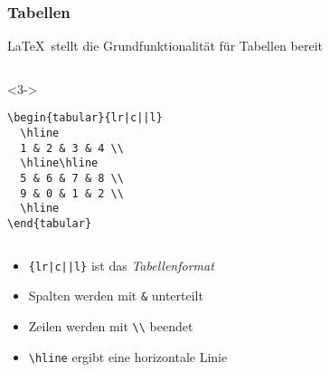 \begin{frame}[fragile]
  \frametitle{Tabellen}


  \LaTeX\ stellt die Grundfunktionalität für Tabellen bereit

  \begin{columns}
    \begin{column}{0.4\linewidth}
      \begin{block}<3->{}
\begin{lstlisting}
\begin{tabular}{lr|c||l}
  \hline
  1 & 2 & 3 & 4 \\
  \hline\hline
  5 & 6 & 7 & 8 \\
  9 & 0 & 1 & 2 \\
  \hline
\end{tabular}
\end{lstlisting}
      \end{block}
    \end{column}
    \begin{column}{0.5\linewidth}
      \centering
    \end{column}
  \end{columns}

  \begin{itemize}
  \item<4-> \lstinline!{lr|c||l}! ist das \emph{Tabellenformat}
  \item<5-> Spalten werden mit \lstinline|&| unterteilt
  \item<6-> Zeilen werden mit \lstinline|\\| beendet
  \item<7-> \lstinline|\hline| ergibt eine horizontale Linie
  \end{itemize}

\end{frame}

